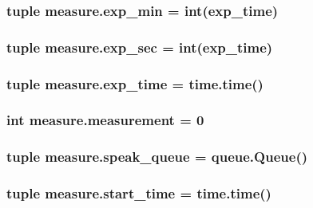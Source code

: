\subsubsection[{exp\+\_\+min}]{\setlength{\rightskip}{0pt plus 5cm}tuple measure.\+exp\+\_\+min = int({\bf exp\+\_\+time})}\label{namespacemeasure_a96bb4b99a91ea6eb9daf66a467aa1c9e}
\hypertarget{namespacemeasure_a869c2ef982e2772fbc71b949d26cf7d0}{}
\subsubsection[{exp\+\_\+sec}]{\setlength{\rightskip}{0pt plus 5cm}tuple measure.\+exp\+\_\+sec = int({\bf exp\+\_\+time})}\label{namespacemeasure_a869c2ef982e2772fbc71b949d26cf7d0}
\hypertarget{namespacemeasure_aad1b89bf56c65c84d05ad5d6dde28ec1}{}
\subsubsection[{exp\+\_\+time}]{\setlength{\rightskip}{0pt plus 5cm}tuple measure.\+exp\+\_\+time = time.\+time()}\label{namespacemeasure_aad1b89bf56c65c84d05ad5d6dde28ec1}
\hypertarget{namespacemeasure_a5ce3f5c291ec743465bc3d544003963d}{}
\subsubsection[{measurement}]{\setlength{\rightskip}{0pt plus 5cm}int measure.\+measurement = 0}\label{namespacemeasure_a5ce3f5c291ec743465bc3d544003963d}
\hypertarget{namespacemeasure_af323a7d2fced20a22d77d5ca33a02deb}{}
\subsubsection[{speak\+\_\+queue}]{\setlength{\rightskip}{0pt plus 5cm}tuple measure.\+speak\+\_\+queue = queue.\+Queue()}\label{namespacemeasure_af323a7d2fced20a22d77d5ca33a02deb}
\hypertarget{namespacemeasure_a5b970496a746cc9ac6c6064be7f3a491}{}
\subsubsection[{start\+\_\+time}]{\setlength{\rightskip}{0pt plus 5cm}tuple measure.\+start\+\_\+time = time.\+time()}\label{namespacemeasure_a5b970496a746cc9ac6c6064be7f3a491}
